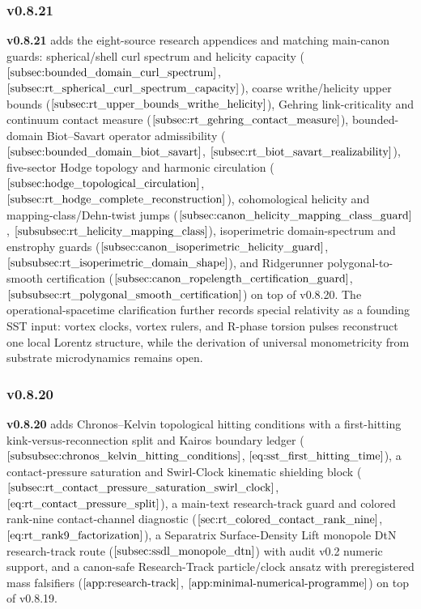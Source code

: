 \documentclass[11pt]{article}
\theoremstyle{definition}
\theoremstyle{plain}
\theoremstyle{remark}
\begin{document}
        \subsubsection{v0.8.21}
            \textbf{v0.8.21} adds the eight-source research appendices and matching main-canon guards: spherical/shell curl spectrum and helicity capacity (\(\ref{subsec:bounded_domain_curl_spectrum}\), \(\ref{subsec:rt_spherical_curl_spectrum_capacity}\)), coarse writhe/helicity upper bounds (\(\ref{subsec:rt_upper_bounds_writhe_helicity}\)), Gehring link-criticality and continuum contact measure (\(\ref{subsec:rt_gehring_contact_measure}\)), bounded-domain Biot--Savart operator admissibility (\(\ref{subsec:bounded_domain_biot_savart}\), \(\ref{subsec:rt_biot_savart_realizability}\)), five-sector Hodge topology and harmonic circulation (\(\ref{subsec:hodge_topological_circulation}\), \(\ref{subsec:rt_hodge_complete_reconstruction}\)), cohomological helicity and mapping-class/Dehn-twist jumps (\(\ref{subsec:canon_helicity_mapping_class_guard}\), \(\ref{subsubsec:rt_helicity_mapping_class}\)), isoperimetric domain-spectrum and enstrophy guards (\(\ref{subsec:canon_isoperimetric_helicity_guard}\), \(\ref{subsubsec:rt_isoperimetric_domain_shape}\)), and Ridgerunner polygonal-to-smooth certification (\(\ref{subsec:canon_ropelength_certification_guard}\), \(\ref{subsubsec:rt_polygonal_smooth_certification}\)) on top of v0.8.20. The operational-spacetime clarification further records special relativity as a founding SST input: vortex clocks, vortex rulers, and R-phase torsion pulses reconstruct one local Lorentz structure, while the derivation of universal monometricity from substrate microdynamics remains open.

        \subsubsection{v0.8.20}
            \textbf{v0.8.20} adds Chronos--Kelvin topological hitting conditions with a first-hitting kink-versus-reconnection split and Kairos boundary ledger (\(\ref{subsubsec:chronos_kelvin_hitting_conditions}\), \(\ref{eq:sst_first_hitting_time}\)), a contact-pressure saturation and Swirl-Clock kinematic shielding block (\(\ref{subsec:rt_contact_pressure_saturation_swirl_clock}\), \(\ref{eq:rt_contact_pressure_split}\)), a main-text research-track guard and colored rank-nine contact-channel diagnostic (\(\ref{sec:rt_colored_contact_rank_nine}\), \(\ref{eq:rt_rank9_factorization}\)), a Separatrix Surface-Density Lift monopole DtN research-track route (\(\ref{subsec:ssdl_monopole_dtn}\)) with audit v0.2 numeric support, and a canon-safe Research-Track particle/clock ansatz with preregistered mass falsifiers (\(\ref{app:research-track}\), \(\ref{app:minimal-numerical-programme}\)) on top of v0.8.19.
\end{document}
